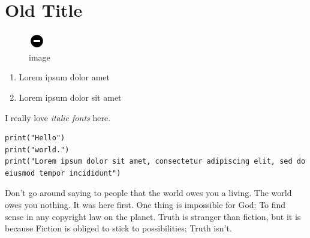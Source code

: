 \hypertarget{old-title}{%
\section{Old Title}\label{old-title}}

\begin{figure}
\centering
\includegraphics{minus.png}
\caption{image}
\end{figure}

\begin{enumerate}
\def\labelenumi{\arabic{enumi}.}
\tightlist
\item
  Lorem ipsum dolor amet
\item
  Lorem ipsum dolor sit amet
\end{enumerate}

I really love \emph{italic fonts} here.

\begin{verbatim}
print("Hello")
print("world.")
print("Lorem ipsum dolor sit amet, consectetur adipiscing elit, sed do eiusmod tempor incididunt")
\end{verbatim}

Don't go around saying to people that the world owes you a living. The
world owes you nothing. It was here first. One thing is impossible for
God: To find sense in any copyright law on the planet. Truth is stranger
than fiction, but it is because Fiction is obliged to stick to
possibilities; Truth isn't.
